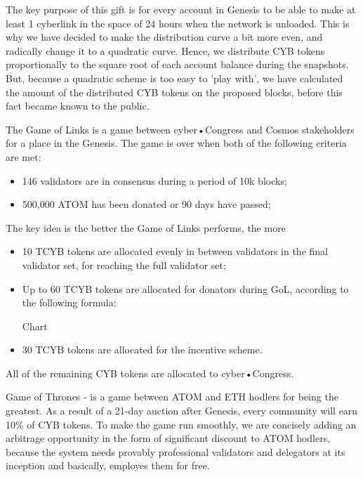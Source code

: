 \documentclass[8pt,oneside]{amsart}
\begin{document}
\begin{Abstract}
The key purpose of this gift is for every account in Genesis to be able to make at least 1 cyberlink in the space of 24 hours when the network is unloaded. This is why we have decided to make the distribution curve a bit more even, and radically change it to a quadratic curve. Hence, we distribute CYB tokens proportionally to the square root of each account balance during the snapshots. But, because a quadratic scheme is too easy to 'play with', we have calculated the amount of the distributed CYB tokens on the proposed blocks, before this fact became known to the public.

The Game of Links is a game between cyber•Congress and Cosmos stakeholders for a place in the Genesis. The game is over when both of the following criteria are met:
\begin{itemize}
\item 146 validators are in consensus during a period of 10k blocks;
\item 500,000 ATOM has been donated or 90 days have passed;
\end{itemize}

The key idea is the better the Game of Links performs, the more %

\begin{itemize}
\item 10 TCYB tokens are allocated evenly in between validators in the final validator set, for reaching the full validator set;
\item Up to 60 TCYB tokens are allocated for donators during GoL, according to the following formula:

Chart

\item 30 TCYB tokens are allocated for the incentive scheme.
\end{itemize}

All of the remaining CYB tokens are allocated to cyber•Congress.

Game of Thrones - is a game between ATOM and ETH hodlers for being the greatest. As a result of a 21-day auction after Genesis, every community will earn 10\% of CYB tokens. To make the game run smoothly, we are concisely adding an arbitrage opportunity in the form of significant discount to ATOM hodlers, because the system needs provably professional validators and delegators at its inception and basically, employes them for free.


\end{Abstract}
\end{document}

